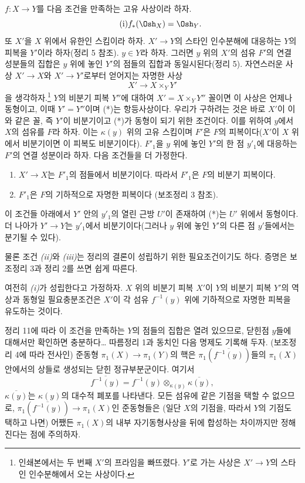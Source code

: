 $f:X\longrightarrow Y$를 다음 조건을 만족하는 고유 사상이라 하자.
\begin{equation}
  \tag{i}
  f_*(\Osh_X)=\Osh_Y.
\end{equation}
또 $X'$을 $X$ 위에서 유한인 스킴이라 하자. $X'\longrightarrow Y$의
스타인 인수분해에 대응하는 $Y$의 피복을 $Y'$이라 하자(정리 5 참조).
$y\in Y$라 하자. 그러면 $y$ 위의 $X'$의 섬유 $F'$의 연결 성분들의
집합은 $y$ 위에 놓인 $Y'$의 점들의 집합과 동일시된다(정리 5). 자연스러운
사상 $X'\longrightarrow X$와
$X'\longrightarrow Y'$로부터 얻어지는 자명한 사상
\begin{equation}
  \tag{*}
  X'\longrightarrow X\times_Y Y'
\end{equation}
을 생각하자.\footnote{인쇄본에서는 두 번째 $X'$의 프라임을 빠뜨렸다.
$Y'$로 가는 사상은 $X'\to Y$의 스타인 인수분해에서 오는 사상이다.}
$Y$의 비분기 피복 $Y''$에 대하여 $X'=X\times_Y Y''$ 꼴이면 이 사상은
언제나 동형이고, 이때 $Y'=Y''$이며 (*)는 항등사상이다. 우리가 구하려는
것은 바로 $X'$이 이와 같은 꼴, 즉 $Y'$이 비분기이고 (*)가 동형이 되기
위한 조건이다. 이를 위하여 $y$에서 $X$의 섬유를 $F$라 하자. 이는
$\kappa(y)$ 위의 고유 스킴이며 $F'$은 $F$의 피복이다($X'$이 $X$ 위에서
비분기이면 이 피복도 비분기이다). $F'_1$을 $y$ 위에 놓인 $Y'$의 한 점
$y'_1$에 대응하는 $F'$의 연결 성분이라 하자. 다음 조건들을 더 가정한다.
\begin{enumerate}
  \item[\textit{(ii)}] $X'\longrightarrow X$는 $F'_1$의 점들에서
    비분기이다. 따라서 $F'_1$은 $F$의 비분기 피복이다.
  \item[\textit{(iii)}] $F'_1$은 $F$의 기하적으로 자명한 피복이다
    (보조정리 3 참조).
\end{enumerate}

 이 조건들 아래에서 $Y'$ 안의 $y'_1$의 열린 근방
$U'$이 존재하여 (*)는 $U'$ 위에서 동형이다. 더 나아가
$Y'\longrightarrow Y$는 $y'_1$에서 비분기이다(그러나 $y$ 위에 놓인
$Y'$의 다른 점 $y'$들에서는 분기될 수 있다).

물론 조건 \textit{(ii)}와 \textit{(iii)}는 정리의 결론이 성립하기
위한 필요조건이기도 하다. 증명은 보조정리 3과 정리 2를 쓰면 쉽게 따른다.

 여전히 \textit{(i)}가 성립한다고 가정하자. $X$ 위의
비분기 피복 $X'$이 $Y$의 비분기 피복 $Y'$의 역상과 동형일 필요충분조건은
$X'$이 각 섬유 $f^{-1}(y)$ 위에 기하적으로 자명한 피복을 유도하는 것이다.

정리 11에 따라 이 조건을 만족하는 $Y$의 점들의 집합은 열려 있으므로,
닫힌점 $y$들에 대해서만 확인하면 충분하다\ldots{} 따름정리 1과 동치인
다음 명제도 기록해 두자. (보조정리 4에 따라 전사인) 준동형
$\pi_1(X)\longrightarrow\pi_1(Y)$의 핵은
$\pi_1(\overline{f^{-1}(y)})$들의 $\pi_1(X)$ 안에서의 상들로 생성되는
닫힌 정규부분군이다. 여기서
\[
  \overline{f^{-1}(y)}
  =f^{-1}(y)\otimes_{\kappa(y)}\overline{\kappa(y)},
\]
$\overline{\kappa(y)}$는 $\kappa(y)$의 대수적 폐포를 나타낸다. 모든
섬유에 같은 기점을 택할 수 없으므로,
$\pi_1(\overline{f^{-1}(y)})\longrightarrow\pi_1(X)$인 준동형들은
(일단 $X$의 기점을, 따라서 $Y$의 기점도 택하고 나면) 어쨌든
$\pi_1(X)$의 내부 자기동형사상을 뒤에 합성하는 차이까지만 정해진다는
점에 주의하자.

